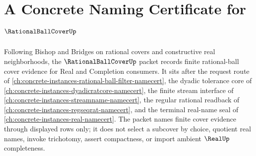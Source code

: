 \chapter{A Concrete Naming Certificate for $\RationalBallCoverUp$}
\label{ch:concrete-instances-rational-ball-cover-namecert}

Following Bishop and Bridges on rational covers and constructive real neighborhoods, the $\RationalBallCoverUp$ packet records finite rational-ball cover evidence for Real and Completion consumers. It sits after the request route of \autoref{ch:concrete-instances-rational-ball-filter-namecert}, the dyadic tolerance core of \autoref{ch:concrete-instances-dyadicratcore-namecert}, the finite stream interface of \autoref{ch:concrete-instances-streamname-namecert}, the regular rational readback of \autoref{ch:concrete-instances-regseqrat-namecert}, and the terminal real-name seal of \autoref{ch:concrete-instances-real-namecert}. The packet names finite cover evidence through displayed rows only; it does not select a subcover by choice, quotient real names, invoke trichotomy, assert compactness, or import ambient $\RealUp$ completeness.

